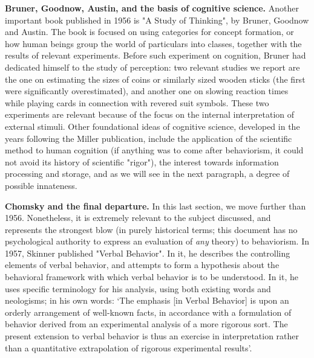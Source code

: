 \documentclass[../main.tex]{subfiles}
\begin{document}
\vspace{4pt}
\textbf{Bruner, Goodnow, Austin, and the basis of cognitive science.} Another important book published in 1956 is "A Study of Thinking", by Bruner, Goodnow and Austin. The book is focused on using categories for concept formation, or how human beings group the world of particulars into classes, together with the results of relevant experiments. Before such experiment on cognition, Bruner had dedicated himself to the study of perception: two relevant studies we report are the one on estimating the sizes of coins or similarly sized wooden sticks (the first were significantly overestimated), and another one on slowing reaction times while playing cards in connection with revered suit symbols. These two experiments are relevant because of the focus on the internal interpretation of external stimuli. Other foundational ideas of cognitive science, developed in the years following the Miller publication, include the application of the scientific method to human cognition (if anything was to come after behaviorism, it could not avoid its history of scientific "rigor"), the interest towards information processing and storage, and as we will see in the next paragraph, a degree of possible innateness.

\vspace{4pt}
\textbf{Chomsky and the final departure.} In this last section, we move further than 1956. Nonetheless, it is extremely relevant to the subject discussed, and represents the strongest blow (in purely historical terms; this document has no psychological authority to express an evaluation of \textit{any} theory) to behaviorism. In 1957, Skinner published "Verbal Behavior". In it, he describes the controlling elements of verbal behavior, and attempts to form a hypothesis about the behavioral framework with which verbal behavior is to be understood. In it, he uses specific terminology for his analysis, using both existing words and neologisms; in his own words: \enquote*{The emphasis [in Verbal Behavior] is upon an orderly arrangement of well-known facts, in accordance with a formulation of behavior derived from an experimental analysis of a more rigorous sort. The present extension to verbal behavior is thus an exercise in interpretation rather than a quantitative extrapolation of rigorous experimental results}\cite{skinnerVerbalBehavior1957}.
\end{document}

